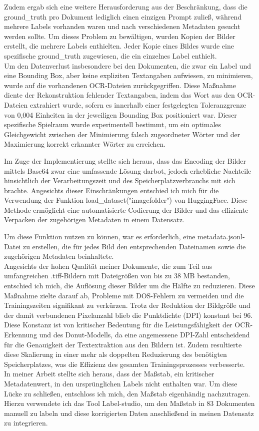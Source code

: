 \documentclass[12pt,a4paper,twoside]{article}
\begin{document}
Zudem ergab sich eine weitere Herausforderung aus der Beschränkung, dass die ground\_truth pro Dokument lediglich einen einzigen Prompt zuließ, während mehrere Labels vorhanden waren und nach verschiedenen Metadaten gesucht werden sollte. Um dieses Problem zu bewältigen, wurden Kopien der Bilder erstellt, die mehrere Labels enthielten. Jeder Kopie eines Bildes wurde eine spezifische ground\_truth zugewiesen, die ein einzelnes Label enthielt. \\
Um den Datenverlust insbesondere bei den Dokumenten, die zwar ein Label und eine Bounding Box, aber keine expliziten Textangaben aufwiesen, zu minimieren, wurde auf die vorhandenen OCR-Dateien zurückgegriffen. Diese Maßnahme diente der Rekonstruktion fehlender Textangaben, indem das Wort aus den OCR-Dateien extrahiert wurde, sofern es innerhalb einer festgelegten Toleranzgrenze von 0,004 Einheiten in der jeweiligen Bounding Box positioniert war. Dieser spezifische Spielraum wurde experimentell bestimmt, um ein optimales Gleichgewicht zwischen der Minimierung falsch zugeordneter Wörter und der Maximierung korrekt erkannter Wörter zu erreichen. 

Im Zuge der Implementierung stellte sich heraus, dass das Encoding der Bilder mittels Base64 zwar eine umfassende Lösung darbot, jedoch erhebliche Nachteile hinsichtlich der Verarbeitungszeit und des Speicherplatzverbrauchs mit sich brachte. Angesichts dieser Einschränkungen entschied ich mich für die Verwendung der Funktion load\_dataset("imagefolder") von HuggingFace. Diese Methode ermöglicht eine automatisierte Codierung der Bilder und das effiziente Verpacken der zugehörigen Metadaten in einem Datensatz.

Um diese Funktion nutzen zu können, war es erforderlich, eine metadata.jsonl-Datei zu erstellen, die für jedes Bild den entsprechenden Dateinamen sowie die zugehörigen Metadaten beinhaltete.\\ 
Angesichts der hohen Qualität meiner Dokumente, die zum Teil aus umfangreichen .tiff-Bildern mit Dateigrößen von bis zu 38 MB bestanden, entschied ich mich, die Auflösung dieser Bilder um die Hälfte zu reduzieren. Diese Maßnahme zielte darauf ab, Probleme mit DOS-Fehlern zu vermeiden und die Trainingszeiten signifikant zu verkürzen. Trotz der Reduktion der Bildgröße und der damit verbundenen Pixelanzahl blieb die Punktdichte (DPI) konstant bei 96. Diese Konstanz ist von kritischer Bedeutung für die Leistungsfähigkeit der OCR-Erkennung und des Donut-Modells, da eine angemessene DPI-Zahl entscheidend für die Genauigkeit der Textextraktion aus den Bildern ist. Zudem resultierte diese Skalierung in einer mehr als doppelten Reduzierung des benötigten Speicherplatzes, was die Effizienz des gesamten Trainingsprozesses verbesserte.\\
In meiner Arbeit stellte sich heraus, dass der Maßstab, ein kritischer Metadatenwert, in den ursprünglichen Labels nicht enthalten war. Um diese Lücke zu schließen, entschloss ich mich, den Maßstab eigenhändig nachzutragen. Hierzu verwendete ich das Tool Label-studio, um den Maßstab in 83 Dokumenten manuell zu labeln und diese korrigierten Daten anschließend in meinen Datensatz zu integrieren.
\end{document}
